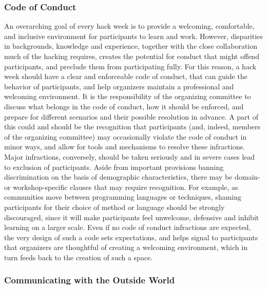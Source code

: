 \documentclass{aastex62}
\begin{document}
\clearpage 
\subsubsection{Code of Conduct}

An overarching goal of every hack week is to provide a welcoming, comfortable, and inclusive environment for participants to learn and work.
However, disparities in backgrounds, knowledge and experience, together with the close collaboration much of the hacking requires, creates the potential for conduct that might offend participants, and preclude them from participating fully.
For this reason, a hack week should have a clear and enforceable code of conduct, that can guide the behavior of participants, and help organizers maintain a professional and welcoming environment.
It is the responsibility of the organizing committee to discuss what belongs in the code of conduct, how it should be enforced, and prepare for different scenarios and their possible resolution in advance.
A part of this could and should be the recognition that participants (and, indeed, members of the organizing committee) may occasionally violate the code of conduct in minor ways, and allow for tools and mechanisms to resolve these infractions. Major infractions, conversely, should be taken seriously and in severe cases lead to exclusion of participants.
Aside from important provisions banning discrimination on the basis of demographic characteristics, there may be domain- or workshop-specific clauses that may require recognition. For example, as communities move between programming languages or techniques, shaming participants for their choice of method or language should be strongly discouraged, since it will make participants feel unwelcome, defensive and inhibit learning on a larger scale.
Even if no code of conduct infractions are expected, the very design of such a code sets expectations, and helps signal to participants that organizers are thoughtful of creating a welcoming environment, which in turn feeds back to the creation of such a space.

\subsubsection{Communicating with the Outside World}
\end{document}
